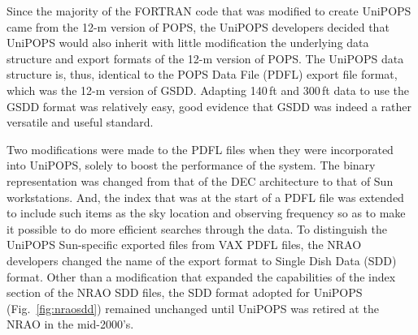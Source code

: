 \documentclass[final,authoryear,5p,times,twocolumn]{elsarticle}
\begin{document}
Since the majority of the FORTRAN code that was modified to create
UniPOPS came from the 12-m version of POPS, the UniPOPS developers
decided that UniPOPS would also inherit with little modification the
underlying data structure and export formats of the 12-m version of
POPS.  The UniPOPS data structure is, thus, identical to the POPS Data File
(PDFL) export file format, which was the 12-m version of GSDD.  Adapting 140\,ft
and 300\,ft data to use the GSDD format was
relatively easy, good evidence that GSDD was indeed a rather versatile
and useful standard.

Two modifications were made to the PDFL files when they were
incorporated into UniPOPS, solely to boost the performance of the
system.  The binary representation was changed from that of the DEC
architecture to that of Sun workstations.  And, the index that was at
the start of a PDFL file was extended to include such items as the sky
location and observing frequency so as to make it possible to do more
efficient searches through the data.  To distinguish the UniPOPS
Sun-specific exported files from VAX PDFL files, the NRAO developers
changed the name of the export format to Single Dish Data (SDD) format.
Other than a modification that expanded the capabilities of the index
section of the NRAO SDD files, the SDD format adopted for UniPOPS
(Fig.~\ref{fig:nraosdd}) remained unchanged until UniPOPS was retired
at the NRAO in the mid-2000's.
\end{document}
